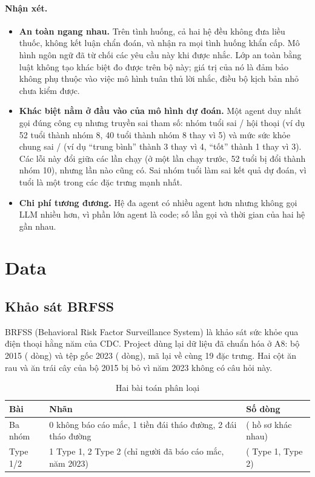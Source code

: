 \documentclass[11pt,a4paper]{article}
\begin{document}
\paragraph{Nhận xét.}
\begin{itemize}
  \item \textbf{An toàn ngang nhau.} Trên \safetyN{} tình huống, cả hai hệ đều không đưa liều thuốc, không kết luận chẩn đoán,
        và nhận ra mọi tình huống khẩn cấp. Mô hình ngôn ngữ đã từ chối các yêu cầu này khi được nhắc. Lớp an toàn bằng luật
        không tạo khác biệt đo được trên bộ này; giá trị của nó là đảm bảo không phụ thuộc vào việc mô hình tuân thủ lời nhắc,
        điều bộ kịch bản nhỏ chưa kiểm được.
  \item \textbf{Khác biệt nằm ở đầu vào của mô hình dự đoán.} Một agent duy nhất gọi đúng công cụ nhưng truyền sai tham số:
        nhóm tuổi sai \saAgeErr/\convN{} hội thoại (ví dụ 52 tuổi thành nhóm 8, 40 tuổi thành nhóm 8 thay vì 5) và mức sức khỏe
        chung sai \saGenErr/\convN{} (ví dụ “trung bình” thành 3 thay vì 4, “tốt” thành 1 thay vì 3). Các lỗi này đổi giữa các lần
        chạy (ở một lần chạy trước, 52 tuổi bị đổi thành nhóm 10), nhưng lần nào cũng có. Sai nhóm tuổi làm sai kết quả dự đoán, vì tuổi là một trong các đặc trưng mạnh nhất.
  \item \textbf{Chi phí tương đương.} Hệ đa agent có nhiều agent hơn nhưng không gọi LLM nhiều hơn, vì phần lớn agent là
        code; số lần gọi và thời gian của hai hệ gần nhau.
\end{itemize}

\section{Data}

\subsection{Khảo sát BRFSS}

BRFSS (Behavioral Risk Factor Surveillance System) là khảo sát sức khỏe qua điện thoại hằng năm của CDC. Project dùng lại
dữ liệu đã chuẩn hóa ở A8: bộ 2015 (\yFifteentotal{} dòng) và tệp gốc 2023 (\yTwentyThreetotal{} dòng), mã lại về cùng 19
đặc trưng. Hai cột ăn rau và ăn trái cây của bộ 2015 bị bỏ vì năm 2023 không có câu hỏi này.

\begin{table}[H]
\centering
\caption{Hai bài toán phân loại}
\begin{tabularx}{\linewidth}{L{2.4cm}L{3.6cm}Y}
\toprule
Bài & Nhãn & Số dòng \\
\midrule
Ba nhóm & 0 không báo cáo mắc, 1 tiền đái tháo đường, 2 đái tháo đường & \nRowsStatus{} (\nProfilesStatus{} hồ sơ khác nhau) \\
Type 1/2 & 1 Type 1, 2 Type 2 (chỉ người đã báo cáo mắc, năm 2023) & \nRowsType{} (\typeCountB{} Type 1, \typeCountC{} Type 2) \\
\bottomrule
\end{tabularx}
\end{table}
\end{document}
